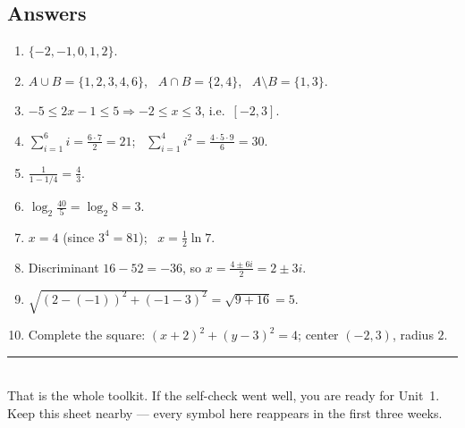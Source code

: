 \documentclass[11pt]{article}
\theoremstyle{definition}
\begin{document}
\subsection*{Answers}
\small
\begin{enumerate}[leftmargin=1.6em,itemsep=1pt]
  \item $\{-2,-1,0,1,2\}$.
  \item $A\cup B=\{1,2,3,4,6\}$, \ $A\cap B=\{2,4\}$, \ $A\setminus B=\{1,3\}$.
  \item $-5\le 2x-1\le 5\Rightarrow -2\le x\le 3$, i.e.\ $[-2,3]$.
  \item $\sum_{i=1}^6 i=\frac{6\cdot7}{2}=21$; \ $\sum_{i=1}^4 i^2=\frac{4\cdot5\cdot9}{6}=30$.
  \item $\frac{1}{1-1/4}=\frac{4}{3}$.
  \item $\log_2\frac{40}{5}=\log_2 8=3$.
  \item $x=4$ (since $3^4=81$); \ $x=\tfrac12\ln 7$.
  \item Discriminant $16-52=-36$, so $x=\frac{4\pm 6i}{2}=2\pm 3i$.
  \item $\sqrt{(2-(-1))^2+(-1-3)^2}=\sqrt{9+16}=5$.
  \item Complete the square: $(x+2)^2+(y-3)^2=4$; center $(-2,3)$, radius $2$.
\end{enumerate}
\normalsize

\vspace{0.6em}
\noindent\rule{\linewidth}{0.4pt}\\[2pt]
{\footnotesize\sffamily That is the whole toolkit. If the self-check went well,
you are ready for Unit~1. Keep this sheet nearby --- every symbol here reappears in
the first three weeks.}
\end{document}
